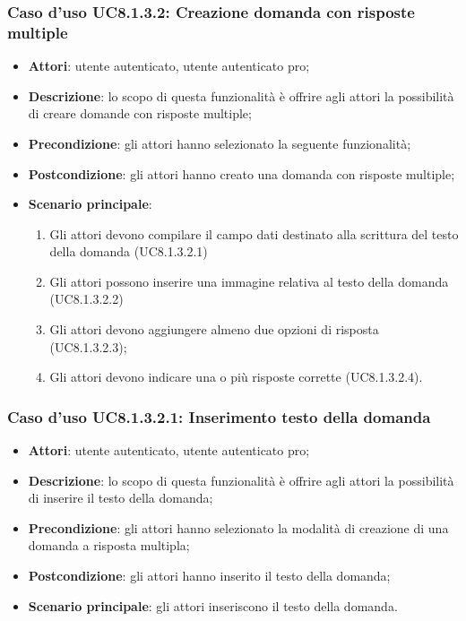 \subsubsection{Caso d'uso UC8.1.3.2: Creazione domanda con risposte multiple}
	\begin{itemize}
		\item
			\textbf{Attori}: utente autenticato, utente autenticato pro;
		\item		
			\textbf{Descrizione}: lo scopo di questa funzionalità è offrire agli attori la possibilità di creare domande con risposte multiple;
		\item
			\textbf{Precondizione}: gli attori hanno selezionato la seguente funzionalità; 
		\item
			\textbf{Postcondizione}: gli attori hanno creato una domanda con risposte multiple;
		\item
			\textbf{Scenario principale}:
	       		\begin{enumerate}
	       			\item
	       			Gli attori devono compilare il campo dati destinato alla scrittura del testo della domanda (UC8.1.3.2.1)
	       			\item
	       			Gli attori possono inserire una immagine relativa al testo della domanda (UC8.1.3.2.2)
	       			\item
	       			Gli attori devono aggiungere almeno due opzioni di risposta (UC8.1.3.2.3);
					\item
					Gli attori devono indicare una o più risposte corrette (UC8.1.3.2.4).
	 			\end{enumerate}
	\end{itemize}

\subsubsection{Caso d'uso UC8.1.3.2.1: Inserimento testo della domanda}
	\begin{itemize}
		\item
			\textbf{Attori}: utente autenticato, utente autenticato pro;
		\item		
			\textbf{Descrizione}: lo scopo di questa funzionalità è offrire agli attori la possibilità di inserire il testo della domanda;
		\item
			\textbf{Precondizione}: gli attori hanno selezionato la modalità di creazione di una domanda a risposta multipla; 
		\item
			\textbf{Postcondizione}: gli attori hanno inserito il testo della domanda;
		\item
			\textbf{Scenario principale}: gli attori inseriscono il testo della domanda. 
	 			
	\end{itemize}
	
